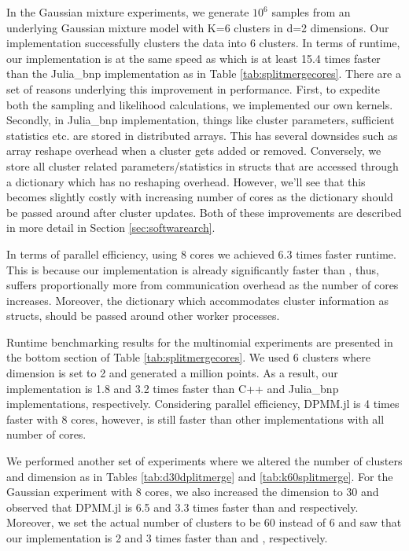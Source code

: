 \documentclass[12pt, a4paper]{article}
\begin{document}
In the Gaussian mixture experiments, we generate $10^6$ samples from an underlying Gaussian mixture model with K=6 clusters in d=2 dimensions. Our implementation successfully clusters the data into 6 clusters. In terms of runtime, our implementation is at the same speed as \cite{Chang2013dpmm} which is at least 15.4 times faster than the Julia\_bnp implementation \cite{yu2016parallel} as in Table \ref{tab:splitmergecores}. There are a set of reasons underlying this improvement in performance. First, to expedite both the sampling and likelihood calculations, we implemented our own kernels. Secondly, in Julia\_bnp implementation, things like  cluster parameters, sufficient statistics etc. are stored in distributed arrays. This has several downsides such as array reshape overhead when a cluster gets added or removed. Conversely, we store all cluster related parameters/statistics in structs that are accessed through a dictionary which has no reshaping overhead. However, we'll see that this becomes slightly costly with increasing number of cores as the dictionary should be passed around after cluster updates. Both of these improvements are described in more detail in Section \ref{sec:softwarearch}.

In terms of parallel efficiency, using 8 cores we achieved 6.3 times faster runtime. This is because our implementation is already significantly faster than \cite{yu2016parallel}, thus, suffers proportionally more from communication overhead as the number of cores increases. Moreover, the dictionary which accommodates cluster information as structs, should be passed around other worker processes.

Runtime benchmarking results for the multinomial experiments are presented in the bottom section of Table \ref{tab:splitmergecores}. We used 6 clusters where dimension is set to 2 and generated a million points. As a result, our implementation is 1.8 and 3.2 times faster than C++ \cite{Chang2013dpmm} and Julia\_bnp \cite{yu2016parallel} implementations, respectively. Considering parallel efficiency, DPMM.jl is 4 times faster with 8 cores, however, is still faster than other implementations with all number of cores.


We performed another set of experiments where we altered the number of clusters and dimension as in Tables \ref{tab:d30dplitmerge} and \ref{tab:k60splitmerge}. For the Gaussian experiment with 8 cores, we also increased the dimension to 30 and observed that DPMM.jl is 6.5 and 3.3 times faster than \cite{yu2016parallel} and \cite{Chang2013dpmm} respectively. Moreover, we set the actual number of clusters to be 60 instead of 6 and saw that our implementation is 2 and 3 times faster than \cite{yu2016parallel} and \cite{Chang2013dpmm}, respectively. 
\end{document}
